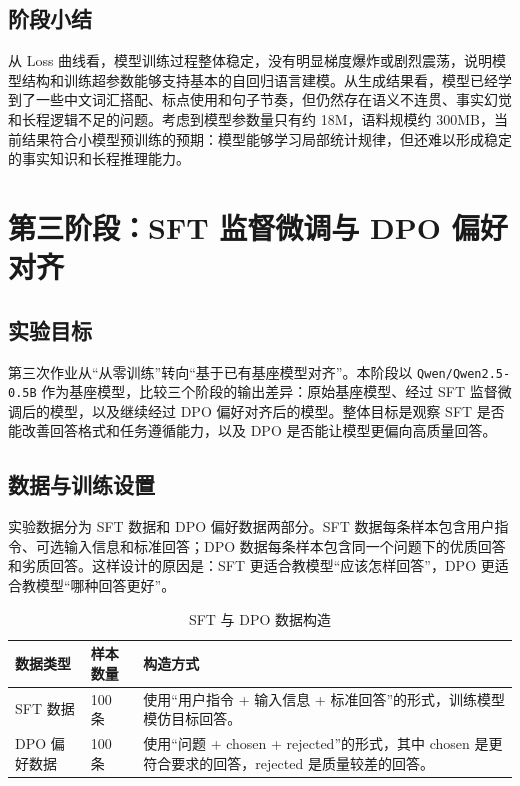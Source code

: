 \documentclass[a4paper,12pt]{ctexart}
\begin{document}
\subsection{阶段小结}

从 Loss 曲线看，模型训练过程整体稳定，没有明显梯度爆炸或剧烈震荡，说明模型结构和训练超参数能够支持基本的自回归语言建模。从生成结果看，模型已经学到了一些中文词汇搭配、标点使用和句子节奏，但仍然存在语义不连贯、事实幻觉和长程逻辑不足的问题。考虑到模型参数量只有约 18M，语料规模约 300MB，当前结果符合小模型预训练的预期：模型能够学习局部统计规律，但还难以形成稳定的事实知识和长程推理能力。

\section{第三阶段：SFT 监督微调与 DPO 偏好对齐}

\subsection{实验目标}

第三次作业从“从零训练”转向“基于已有基座模型对齐”。本阶段以 \texttt{Qwen/Qwen2.5-0.5B} 作为基座模型，比较三个阶段的输出差异：原始基座模型、经过 SFT 监督微调后的模型，以及继续经过 DPO 偏好对齐后的模型。整体目标是观察 SFT 是否能改善回答格式和任务遵循能力，以及 DPO 是否能让模型更偏向高质量回答。

\subsection{数据与训练设置}

实验数据分为 SFT 数据和 DPO 偏好数据两部分。SFT 数据每条样本包含用户指令、可选输入信息和标准回答；DPO 数据每条样本包含同一个问题下的优质回答和劣质回答。这样设计的原因是：SFT 更适合教模型“应该怎样回答”，DPO 更适合教模型“哪种回答更好”。

\begin{table}[H]
    \centering
    \begin{tabularx}{\textwidth}{L{0.22\textwidth}L{0.18\textwidth}Y}
        \toprule
        数据类型 & 样本数量 & 构造方式 \\
        \midrule
        SFT 数据 & 100 条 & 使用“用户指令 + 输入信息 + 标准回答”的形式，训练模型模仿目标回答。 \\
        DPO 偏好数据 & 100 条 & 使用“问题 + chosen + rejected”的形式，其中 chosen 是更符合要求的回答，rejected 是质量较差的回答。 \\
        \bottomrule
    \end{tabularx}
    \caption{SFT 与 DPO 数据构造}
\end{table}
\end{document}
